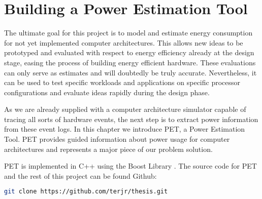 \chapter{Building a Power Estimation Tool}

The ultimate goal for this project is to model and estimate energy consumption
for not yet implemented computer architectures. This allows new ideas to be
prototyped and evaluated with respect to energy efficiency already at the design
stage, easing the process of building energy efficient hardware. These
evaluations can only serve as estimates and will doubtedly be truly accurate.
Nevertheless, it can be used to test specific workloads and applications on
specific processor configurations and evaluate ideas rapidly during the design
phase.

As we are already supplied with a computer architecture simulator capable of
tracing all sorts of hardware events, the next step is to extract power
information from these event logs. In this chapter we introduce PET, a Power
Estimation Tool. PET provides guided information about power usage for computer
architectures and represents a major piece of our problem solution.

\noindent PET is implemented in C++ using the Boost Library \cite{boostwebpage}.
The source code for PET and the rest of this project can be found Github:

\begin{lstlisting}[language=bash,numbers=none]
git clone https://github.com/terjr/thesis.git
\end{lstlisting}






